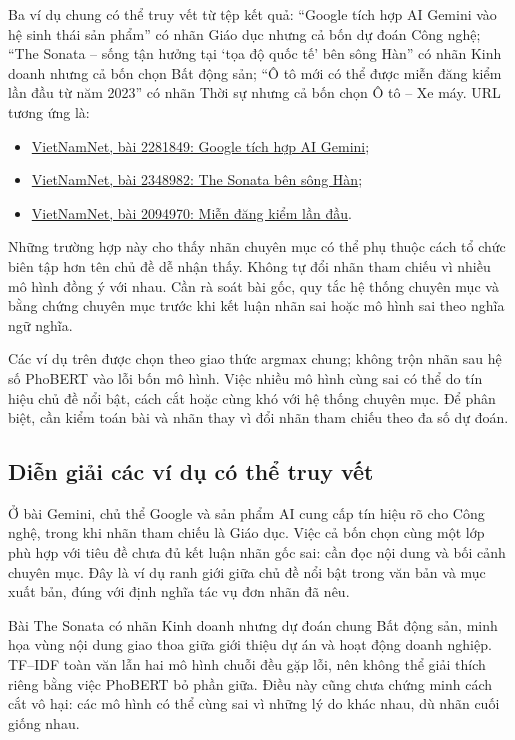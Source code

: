 Ba ví dụ chung có thể truy vết từ tệp kết quả: ``Google tích hợp AI Gemini vào hệ sinh thái sản phẩm'' có nhãn Giáo dục nhưng cả bốn dự đoán Công nghệ; ``The Sonata -- sống tận hưởng tại `tọa độ quốc tế' bên sông Hàn'' có nhãn Kinh doanh nhưng cả bốn chọn Bất động sản; ``Ô tô mới có thể được miễn đăng kiểm lần đầu từ năm 2023'' có nhãn Thời sự nhưng cả bốn chọn Ô tô -- Xe máy. URL tương ứng là:
\begin{itemize}
\item \href{https://vietnamnet.vn/google-tich-hop-ai-gemini-vao-he-sinh-thai-san-pham-2281849.html}{VietNamNet, bài 2281849: Google tích hợp AI Gemini};
\item \href{https://vietnamnet.vn/the-sonata-song-tan-huong-tai-toa-do-quoc-te-ben-song-han-2348982.html}{VietNamNet, bài 2348982: The Sonata bên sông Hàn};
\item \href{https://vietnamnet.vn/o-to-moi-co-the-duoc-mien-dang-kiem-lan-dau-tu-nam-2023-2094970.html}{VietNamNet, bài 2094970: Miễn đăng kiểm lần đầu}.
\end{itemize}
Những trường hợp này cho thấy nhãn chuyên mục có thể phụ thuộc cách tổ chức biên tập hơn tên chủ đề dễ nhận thấy. Không tự đổi nhãn tham chiếu vì nhiều mô hình đồng ý với nhau. Cần rà soát bài gốc, quy tắc hệ thống chuyên mục và bằng chứng chuyên mục trước khi kết luận nhãn sai hoặc mô hình sai theo nghĩa ngữ nghĩa.


Các ví dụ trên được chọn theo giao thức argmax chung; không trộn nhãn sau hệ số PhoBERT vào lỗi bốn mô hình. Việc nhiều mô hình cùng sai có thể do tín hiệu chủ đề nổi bật, cách cắt hoặc cùng khó với hệ thống chuyên mục. Để phân biệt, cần kiểm toán bài và nhãn thay vì đổi nhãn tham chiếu theo đa số dự đoán.


\subsection{Diễn giải các ví dụ có thể truy vết}
Ở bài Gemini, chủ thể Google và sản phẩm AI cung cấp tín hiệu rõ cho Công nghệ, trong khi nhãn tham chiếu là Giáo dục. Việc cả bốn chọn cùng một lớp phù hợp với tiêu đề chưa đủ kết luận nhãn gốc sai: cần đọc nội dung và bối cảnh chuyên mục. Đây là ví dụ ranh giới giữa chủ đề nổi bật trong văn bản và mục xuất bản, đúng với định nghĩa tác vụ đơn nhãn đã nêu.

Bài The Sonata có nhãn Kinh doanh nhưng dự đoán chung Bất động sản, minh họa vùng nội dung giao thoa giữa giới thiệu dự án và hoạt động doanh nghiệp. TF--IDF toàn văn lẫn hai mô hình chuỗi đều gặp lỗi, nên không thể giải thích riêng bằng việc PhoBERT bỏ phần giữa. Điều này cũng chưa chứng minh cách cắt vô hại: các mô hình có thể cùng sai vì những lý do khác nhau, dù nhãn cuối giống nhau.

